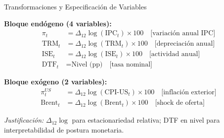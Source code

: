 \documentclass[aspectratio=169, 11pt]{beamer}
\begin{document}


\begin{frame}{Transformaciones y Especificación de Variables}
\normalsize
\vspace{0.2cm}

\textbf{Bloque endógeno (4 variables):}
\begin{align*}
\pi_t &= \Delta_{12}\log(\text{IPC}_t) \times 100 \quad \text{[variación anual IPC]} \\
\text{TRM}_t &= \Delta_{12}\log(\text{TRM}_t) \times 100 \quad \text{[depreciación anual]} \\
\text{ISE}_t &= \Delta_{12}\log(\text{ISE}_t) \times 100 \quad \text{[actividad anual]} \\
\text{DTF}_t &= \text{Nivel (pp)} \quad \text{[tasa nominal]}
\end{align*}

\textbf{Bloque exógeno (2 variables):}
\begin{align*}
\pi^{US}_t &= \Delta_{12}\log(\text{CPI-US}_t) \times 100 \quad \text{[inflación exterior]} \\
\text{Brent}_t &= \Delta_{12}\log(\text{Brent}_t) \times 100 \quad \text{[shock de oferta]}
\end{align*}

\small
\textit{Justificación:} $\Delta_{12}\log$ para estacionariedad relativa; DTF en nivel para interpretabilidad de postura monetaria.
\end{frame}
\end{document}
